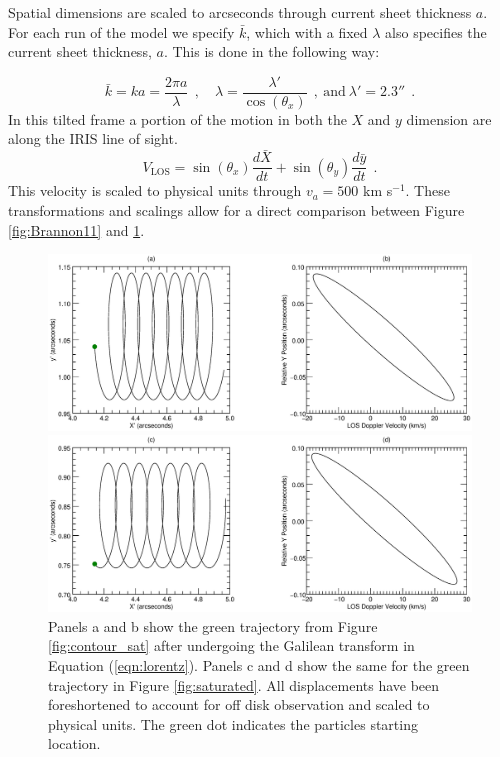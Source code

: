Spatial dimensions are scaled to arcseconds through current sheet thickness $a$.  For each run of the model we specify $\bar{k}$, which with a fixed $\lambda$ also specifies the current sheet thickness, $a$. This is done in the following way:
	
	\begin{equation}
		\bar{k} = ka = \frac{2\pi a}{\lambda}~~, \quad \lambda = \frac{\lambda'}{\cos(\theta_x)}~~,~\mathrm{and}~\lambda'=2.3''~~.
	\end{equation}
In this tilted frame a portion of the motion in both the $X$ and $y$ dimension are along the IRIS line of sight.
	\begin{equation}
		V_{\mathrm{LOS}} = \sin(\theta_x)\frac{d\bar{X}}{dt} + \sin(\theta_y)\frac{d\bar{y}}{dt}~~.
	\end{equation}
This velocity is scaled to physical units through $v_a = 500$ km s$^{-1}$. These transformations and scalings allow for a direct comparison between Figure \ref{fig:Brannon11} and \ref{fig:traj}.  

\begin{figure}[htbp]

	\centerline{\includegraphics[scale=.45]{ParkerLongcope2017/trajectory.eps}}
	\centerline{\includegraphics[scale=.45]{ParkerLongcope2017/Ref_Response_1b.eps}}
	\caption{Panels a and b show the green trajectory from Figure \ref{fig:contour_sat} after undergoing the Galilean transform in Equation (\ref{eqn:lorentz}). Panels c and d show the same for the green trajectory in Figure \ref{fig:saturated}. All displacements have been foreshortened to account for off disk observation and scaled to physical units.   The green dot indicates the particles starting location.}
	\label{fig:traj}
\end{figure}

